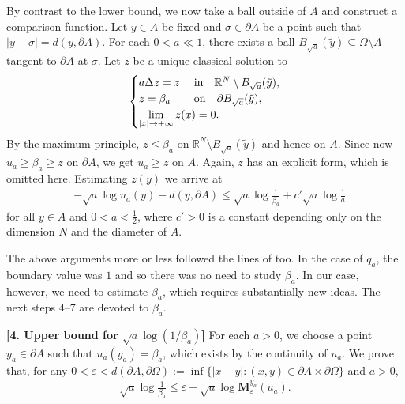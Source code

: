 \documentclass[graybox]{svmult}
\newcommand{\ep}{\varepsilon}
\newcommand{\R}{\mathbb{R}}  %
\renewcommand{\AA}{A}  %
\newcommand{\vmean}{\mathbf{M}}  %
\begin{document}
By contrast to the lower bound, we now take a ball outside of $\AA$ and construct a comparison function. Let $y \in \AA$ be fixed and $\sigma \in \partial \AA$ be a point such that $|y-\sigma| =d(y, \partial \AA)$. For each $0<a\ll 1$, there exists a ball $B_{\sqrt{a}}(\tilde{y}) \subseteq \Omega\setminus \AA$ tangent to $\partial \AA$ at $\sigma$. Let  $z$ be a unique classical solution to 
\begin{equation*}%
\begin{cases}
a\Delta z = z &\hspace{-15mm} \quad \text{in} \quad \R^N\setminus B_{\sqrt{a}}(\tilde{y}),\\
z=\beta_a&\hspace{-15mm} \quad \text{on}\quad \partial B_{\sqrt{a}}(\tilde{y}),\\
\displaystyle \lim_{|x|\to +{\infty}}z(x)=0. &
\end{cases}
\end{equation*} By the maximum principle, $z \le \beta_a$ on $\R^N\setminus B_{\sqrt{a}}(\tilde{y})$ and hence on $\AA$. 
Since now $u_a \ge \beta_a \ge z$ on $\partial \AA$, we get $u_a \ge z$ on $\AA$. Again, $z$ has an explicit form, which is omitted here.  
Estimating $z(y)$ we arrive at 
\begin{align} \label{eq:upper}
&-\sqrt{a}\log u_a(y)-d(y,\partial \AA)
\le    \sqrt{a}\log \frac1{\beta_a }  
+c' \sqrt{a}\log\frac1{a}  
\end{align}
for all $y \in \AA$ and $0<a <\frac1{2}$, where $c'>0$ is a constant depending only on the dimension $N$ and the diameter of $\AA$. 

The above arguments more or less followed the lines of \cite{V67} too. In the case of $q_a$, the boundary value was $1$ and so there was no need to study $\beta_a$.  In our case, however, we need to estimate $\beta_a$, which requires substantially new ideas. The next steps 4--7 are devoted to $\beta_a$. 

\vspace{3mm}
\noindent
\textbf{[4. Upper bound for $\sqrt{a} \log (1/\beta_a)$]\hspace{2mm}}
For each $a>0$, we choose a point $y_a \in \partial \AA$ such that $u_a(y_a)=\beta_a$, which exists by the continuity of $u_a$. 
We prove that, for any $0<\ep<d(\partial \AA, \partial \Omega):= \inf\{|x-y|:(x,y)\in\partial \AA \times \partial \Omega\}$ and $a>0$,  
\begin{align} 
\sqrt{a}\log \frac1{\beta_a}
\le
\ep-
\sqrt{a}\log \vmean_{\ep}^{y_a}({u_a}).  \label{eq:logC_a}
\end{align}
\end{document}
